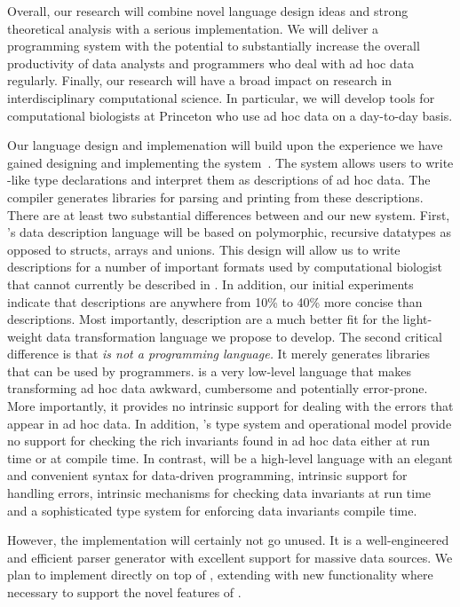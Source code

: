 \documentclass[11pt]{article}
\begin{document}
Overall, our research will combine novel language design ideas
and strong theoretical analysis with a serious implementation.  
We will deliver a programming system with the potential to substantially
increase the overall productivity of data analysts and
programmers who deal with ad hoc data regularly.
Finally, our research will have a broad impact on research in
interdisciplinary computational science.  In particular, we will develop tools for
computational biologists at Princeton who use ad hoc data on a day-to-day
basis.

Our language design and implemenation will build upon the experience we have
gained designing and implementing the \pads{} system~\cite{fisher+:pads,pads-website}.
The \pads{} system allows users to write \C-like type declarations and
interpret them as descriptions of ad hoc data.  The \pads{} compiler
generates libraries for parsing and printing from these descriptions.  There are at least 
two substantial differences between
\pads{} and our new system.  First, \datatype's data description
language will be based on polymorphic, recursive datatypes as opposed to 
\C{} structs, arrays and unions.  This design will allow us to write descriptions
for a number of important formats used by computational biologist that cannot currently be
described in \pads.  In addition, our initial experiments
indicate that \datatype{} descriptions are anywhere from 10\% to 40\% more concise than
\pads{} descriptions.
Most importantly, \datatype{} description are a much better fit for the light-weight 
data transformation language we propose to develop.
The second critical difference is that {\em \pads{} is not a programming language.}
It merely generates libraries that can be used by \C{} programmers.  \C{}
is a very low-level language that makes transforming ad hoc data awkward, cumbersome
and potentially error-prone.  More importantly, it provides no intrinsic support for dealing with the errors
that appear in ad hoc data.  In addition, \C's type system and operational model provide no support for checking
the rich invariants found in ad hoc data either at run time or at compile time.  In contrast, 
\datatype{} will be a high-level language with an elegant and convenient syntax for 
data-driven programming, intrinsic support for handling errors, intrinsic mechanisms for checking data invariants at
run time and a sophisticated type system for enforcing data invariants compile time.  

However, the \pads{} implementation will certainly not go unused.  It is a well-engineered
and efficient parser generator with excellent support for massive data sources.
We plan to implement \datatype{} directly on top of \pads{}, extending \pads{}
with new functionality where necessary to support the novel features of \datatype.
\end{document}
